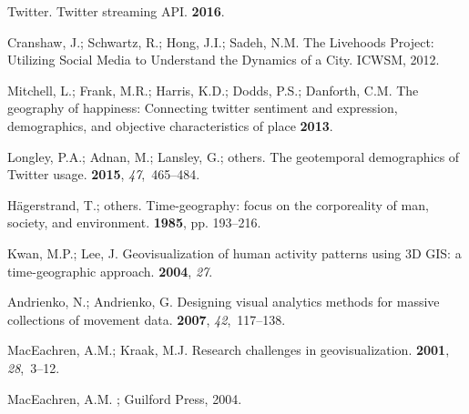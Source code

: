 \documentclass[ijgi,article,accept,moreauthors,pdftex,10pt,a4paper]{mdpi}
\theoremstyle{mdpi}
\newcounter{ex}
\newcounter{re}
\theoremstyle{mdpidefinition}
\begin{document}
\begin{thebibliography}{-------}
Twitter.
\newblock Twitter streaming API.
 {\bf
  2016}.

Cranshaw, J.; Schwartz, R.; Hong, J.I.; Sadeh, N.M.
\newblock The Livehoods Project: Utilizing Social Media to Understand the
  Dynamics of a City.
\newblock  ICWSM,  2012.

Mitchell, L.; Frank, M.R.; Harris, K.D.; Dodds, P.S.; Danforth, C.M.
\newblock The geography of happiness: Connecting twitter sentiment and
  expression, demographics, and objective characteristics of place {\bf 2013}.

Longley, P.A.; Adnan, M.; Lansley, G.; others.
\newblock The geotemporal demographics of Twitter usage.
 {\bf 2015}, {\em 47},~465--484.

H{\"a}gerstrand, T.; others.
\newblock Time-geography: focus on the corporeality of man, society, and
  environment.
 {\bf 1985}, pp. 193--216.

Kwan, M.P.; Lee, J.
\newblock Geovisualization of human activity patterns using 3D GIS: a
  time-geographic approach.
 {\bf 2004}, {\em 27}.

Andrienko, N.; Andrienko, G.
\newblock Designing visual analytics methods for massive collections of
  movement data.
 {\bf 2007}, {\em 42},~117--138.

MacEachren, A.M.; Kraak, M.J.
\newblock Research challenges in geovisualization.
 {\bf 2001}, {\em
  28},~3--12.

MacEachren, A.M.
;
  Guilford Press,  2004.


\end{thebibliography}
\end{document}
